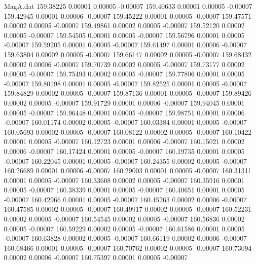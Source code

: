 \begin{filecontents}{MagA.dat}
 159.38225    0.00001    0.00005   -0.00007
 159.40633    0.00001    0.00005   -0.00007
 159.42945    0.00001    0.00006   -0.00007
 159.45222    0.00001    0.00005   -0.00007
 159.47571    0.00002    0.00005   -0.00007
 159.49861    0.00002    0.00005   -0.00007
 159.52120    0.00002    0.00005   -0.00007
 159.54505    0.00001    0.00005   -0.00007
 159.56796    0.00001    0.00005   -0.00007
 159.59205    0.00001    0.00005   -0.00007
 159.61497    0.00001    0.00006   -0.00007
 159.63804    0.00002    0.00005   -0.00007
 159.66147    0.00002    0.00005   -0.00007
 159.68432    0.00002    0.00006   -0.00007
 159.70739    0.00002    0.00005   -0.00007
 159.73177    0.00002    0.00005   -0.00007
 159.75493    0.00002    0.00005   -0.00007
 159.77806    0.00001    0.00005   -0.00007
 159.80198    0.00001    0.00005   -0.00007
 159.82525    0.00001    0.00005   -0.00007
 159.84829    0.00002    0.00005   -0.00007
 159.87136    0.00001    0.00005   -0.00007
 159.89426    0.00002    0.00005   -0.00007
 159.91729    0.00001    0.00006   -0.00007
 159.94045    0.00001    0.00005   -0.00007
 159.96448    0.00001    0.00005   -0.00007
 159.98751    0.00001    0.00006   -0.00007
 160.01174    0.00002    0.00005   -0.00007
 160.03384    0.00001    0.00005   -0.00007
 160.05693    0.00002    0.00005   -0.00007
 160.08122    0.00002    0.00005   -0.00007
 160.10422    0.00001    0.00005   -0.00007
 160.12723    0.00001    0.00006   -0.00007
 160.15021    0.00002    0.00006   -0.00007
 160.17424    0.00001    0.00005   -0.00007
 160.19735    0.00001    0.00005   -0.00007
 160.22045    0.00001    0.00005   -0.00007
 160.24355    0.00002    0.00005   -0.00007
 160.26689    0.00001    0.00006   -0.00007
 160.29003    0.00001    0.00005   -0.00007
 160.31311    0.00001    0.00005   -0.00007
 160.33608    0.00002    0.00005   -0.00007
 160.35916    0.00001    0.00005   -0.00007
 160.38339    0.00001    0.00005   -0.00007
 160.40651    0.00001    0.00005   -0.00007
 160.42966    0.00001    0.00005   -0.00007
 160.45263    0.00002    0.00006   -0.00007
 160.47585    0.00002    0.00005   -0.00007
 160.49917    0.00002    0.00005   -0.00007
 160.52231    0.00002    0.00005   -0.00007
 160.54545    0.00002    0.00005   -0.00007
 160.56836    0.00002    0.00005   -0.00007
 160.59229    0.00002    0.00005   -0.00007
 160.61586    0.00001    0.00005   -0.00007
 160.63828    0.00002    0.00005   -0.00007
 160.66119    0.00002    0.00006   -0.00007
 160.68466    0.00001    0.00005   -0.00007
 160.70762    0.00002    0.00005   -0.00007
 160.73094    0.00002    0.00006   -0.00007
 160.75397    0.00001    0.00005   -0.00007

\end{filecontents}
